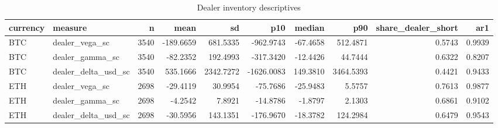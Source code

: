 \begin{table}
\caption{Dealer inventory descriptives}
\label{tab:t2_inventory_summary}
\begin{tabular}{llrrrrrrrr}
\toprule
currency & measure & n & mean & sd & p10 & median & p90 & share\_dealer\_short & ar1 \\
\midrule
BTC & dealer\_vega\_sc & 3540 & -189.6659 & 681.5335 & -962.9743 & -67.4658 & 512.4871 & 0.5743 & 0.9939 \\
BTC & dealer\_gamma\_sc & 3540 & -82.2352 & 192.4993 & -317.3420 & -12.4426 & 44.7444 & 0.6322 & 0.8207 \\
BTC & dealer\_delta\_usd\_sc & 3540 & 535.1666 & 2342.7272 & -1626.0083 & 149.3810 & 3464.5393 & 0.4421 & 0.9433 \\
ETH & dealer\_vega\_sc & 2698 & -29.4119 & 30.9954 & -75.7686 & -25.9483 & 5.5757 & 0.7613 & 0.9877 \\
ETH & dealer\_gamma\_sc & 2698 & -4.2542 & 7.8921 & -14.8786 & -1.8797 & 2.1303 & 0.6861 & 0.9102 \\
ETH & dealer\_delta\_usd\_sc & 2698 & -30.5956 & 143.1351 & -176.9670 & -18.3782 & 124.2984 & 0.6479 & 0.9543 \\
\bottomrule
\end{tabular}
\end{table}

